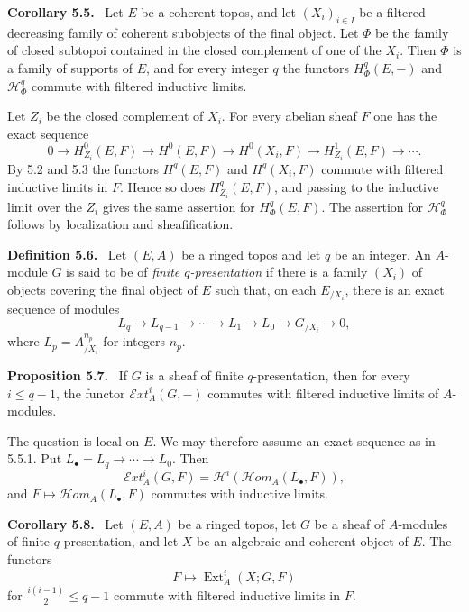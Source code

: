 \documentclass[11pt]{article}
\newcommand{\Ext}{\operatorname{Ext}}
\newenvironment{statement}[1]{\par\medskip\noindent\textbf{#1.}\ }{\par\medskip}
\newenvironment{remarktext}[1]{\par\medskip\noindent\textbf{#1.}\ }{\par\medskip}
\begin{document}
\begin{statement}{Corollary 5.5}
Let \(E\) be a coherent topos, and let \((X_i)_{i\in I}\) be a filtered decreasing family of coherent subobjects of the final object. Let \(\Phi\) be the family of closed subtopoi contained in the closed complement of one of the \(X_i\). Then \(\Phi\) is a family of supports of \(E\), and for every integer \(q\) the functors \(H^q_\Phi(E,-)\) and \(\mathcal H^q_\Phi\) commute with filtered inductive limits.
\end{statement}

Let \(Z_i\) be the closed complement of \(X_i\). For every abelian sheaf \(F\) one has the exact sequence
\[
0\to H^0_{Z_i}(E,F)\to H^0(E,F)\to H^0(X_i,F)\to H^1_{Z_i}(E,F)\to\cdots.
\]
By 5.2 and 5.3 the functors \(H^q(E,F)\) and \(H^q(X_i,F)\) commute with filtered inductive limits in \(F\). Hence so does \(H^q_{Z_i}(E,F)\), and passing to the inductive limit over the \(Z_i\) gives the same assertion for \(H^q_\Phi(E,F)\). The assertion for \(\mathcal H^q_\Phi\) follows by localization and sheafification.

\begin{remarktext}{Definition 5.6}
Let \((E,A)\) be a ringed topos and let \(q\) be an integer. An \(A\)-module \(G\) is said to be of \emph{finite \(q\)-presentation} if there is a family \((X_i)\) of objects covering the final object of \(E\) such that, on each \(E_{/X_i}\), there is an exact sequence of modules
\[
L_q\to L_{q-1}\to\cdots\to L_1\to L_0\to G_{/X_i}\to0, \tag{5.5.1}
\]
where \(L_p=A^{n_p}_{/X_i}\) for integers \(n_p\).
\end{remarktext}

\begin{statement}{Proposition 5.7}
If \(G\) is a sheaf of finite \(q\)-presentation, then for every \(i\le q-1\), the functor \(\mathcal Ext^i_A(G,-)\) commutes with filtered inductive limits of \(A\)-modules.
\end{statement}

The question is local on \(E\). We may therefore assume an exact sequence as in 5.5.1. Put \(L_\bullet=L_q\to\cdots\to L_0\). Then
\[
 \mathcal Ext^i_A(G,F)=\mathcal H^i(\mathcal{H}om_A(L_\bullet,F)),
\]
and \(F\mapsto\mathcal{H}om_A(L_\bullet,F)\) commutes with inductive limits.

\begin{statement}{Corollary 5.8}
Let \((E,A)\) be a ringed topos, let \(G\) be a sheaf of \(A\)-modules of finite \(q\)-presentation, and let \(X\) be an algebraic and coherent object of \(E\). The functors
\[
 F\longmapsto \Ext^i_A(X;G,F)
\]
for \(\frac{i(i-1)}2\le q-1\) commute with filtered inductive limits in \(F\).
\end{statement}
\end{document}
